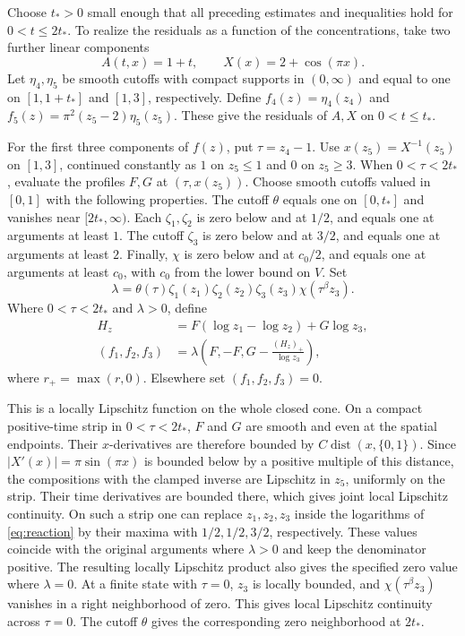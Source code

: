 \documentclass[11pt]{article}
\begin{document}
Choose \(t_*>0\) small enough that all preceding estimates and inequalities
hold for \(0<t\le2t_*\). To realize the residuals as a function of the
concentrations, take two further linear components
\[
 A(t,x)=1+t,\qquad X(x)=2+\cos(\pi x).
\]
Let \(\eta_4,\eta_5\) be smooth cutoffs with compact supports in
\((0,\infty)\) and equal to one on \([1,1+t_*]\) and \([1,3]\),
respectively. Define \(f_4(z)=\eta_4(z_4)\) and
\(f_5(z)=\pi^2(z_5-2)\eta_5(z_5)\). These give the residuals of
\(A,X\) on \(0<t\le t_*\).

For the first three components of \(f(z)\), put \(\tau=z_4-1\).
Use \(x(z_5)=X^{-1}(z_5)\) on \([1,3]\), continued constantly
as \(1\) on \(z_5\le1\) and \(0\) on \(z_5\ge3\).
When \(0<\tau<2t_*\), evaluate the profiles \(F,G\) at
\((\tau,x(z_5))\). Choose smooth cutoffs valued in \([0,1]\)
with the following properties. The cutoff \(\theta\) equals one on
\([0,t_*]\) and vanishes near \([2t_*,\infty)\). Each
\(\zeta_1,\zeta_2\) is zero below and at \(1/2\), and equals one
at arguments at least \(1\). The cutoff \(\zeta_3\) is zero
below and at \(3/2\), and equals one at arguments at least \(2\).
Finally, \(\chi\) is zero below and at \(c_0/2\), and equals one
at arguments at least \(c_0\), with \(c_0\) from the lower bound on \(V\).
Set
\[
 \lambda=\theta(\tau)\zeta_1(z_1)\zeta_2(z_2)
           \zeta_3(z_3)\chi(\tau^\beta z_3).
\]
Where \(0<\tau<2t_*\) and \(\lambda>0\), define
\begin{equation}
\begin{aligned}
 H_z&=F(\log z_1-\log z_2)+G\log z_3,\\
 (f_1,f_2,f_3)&=\lambda
       \left(F,-F,G-\frac{(H_z)_+}{\log z_3}\right),
\end{aligned}
\label{eq:reaction}
\end{equation}
where \(r_+=\max(r,0)\). Elsewhere set \((f_1,f_2,f_3)=0\).

This is a locally Lipschitz function on the whole closed cone.
On a compact positive-time strip in \(0<\tau<2t_*\), \(F\) and \(G\)
are smooth and even at the spatial endpoints. Their \(x\)-derivatives
are therefore bounded by \(C\operatorname{dist}(x,\{0,1\})\).
Since \(|X'(x)|=\pi\sin(\pi x)\) is bounded below by a positive
multiple of this distance, the compositions with the clamped inverse
are Lipschitz in \(z_5\), uniformly on the strip. Their time
derivatives are bounded there, which gives joint local Lipschitz
continuity. On such a strip one can replace \(z_1,z_2,z_3\) inside
the logarithms of \eqref{eq:reaction} by their maxima with
\(1/2,1/2,3/2\), respectively. These values coincide with the
original arguments where \(\lambda>0\) and keep the denominator
positive. The resulting locally Lipschitz product also gives the
specified zero value where \(\lambda=0\). At a finite state with
\(\tau=0\), \(z_3\)
is locally bounded, and \(\chi(\tau^\beta z_3)\) vanishes in a
right neighborhood of zero. This gives local Lipschitz continuity
across \(\tau=0\). The cutoff \(\theta\) gives the corresponding
zero neighborhood at \(2t_*\).
\end{document}
